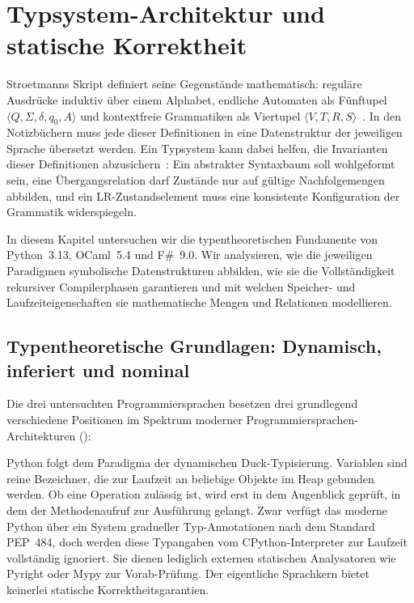 \chapter{Typsystem-Architektur und statische Korrektheit}
\label{chap:type_systems}

Stroetmanns Skript definiert seine Gegenstände mathematisch: reguläre Ausdrücke induktiv über einem Alphabet, endliche Automaten als Fünftupel $\langle Q, \Sigma, \delta, q_0, A \rangle$ und kontextfreie Grammatiken als Viertupel $\langle V, T, R, S \rangle$~\cite{stroetmann2026formal}.
In den Notizbüchern muss jede dieser Definitionen in eine Datenstruktur der jeweiligen Sprache übersetzt werden.
Ein Typsystem kann dabei helfen, die Invarianten dieser Definitionen abzusichern~\cite{pierce2002types}: Ein abstrakter Syntaxbaum soll wohlgeformt sein, eine Übergangsrelation darf Zustände nur auf gültige Nachfolgemengen abbilden, und ein LR-Zustandselement muss eine konsistente Konfiguration der Grammatik widerspiegeln.

In diesem Kapitel untersuchen wir die typentheoretischen Fundamente von Python~3.13, OCaml~5.4 und F\#~9.0. Wir analysieren, wie die jeweiligen Paradigmen symbolische Datenstrukturen abbilden, wie sie die Vollständigkeit rekursiver Compilerphasen garantieren und mit welchen Speicher- und Laufzeiteigenschaften sie mathematische Mengen und Relationen modellieren.

\section{Typentheoretische Grundlagen: Dynamisch, inferiert und nominal}
\label{sec:typing_foundations}

Die drei untersuchten Programmiersprachen besetzen drei grundlegend verschiedene Positionen im Spektrum moderner Programmiersprachen-Architekturen ():

Python folgt dem Paradigma der dynamischen Duck-Typisierung.
Variablen sind reine Bezeichner, die zur Laufzeit an beliebige Objekte im Heap gebunden werden.
Ob eine Operation zulässig ist, wird erst in dem Augenblick geprüft, in dem der Methodenaufruf zur Ausführung gelangt.
Zwar verfügt das moderne Python über ein System gradueller Typ-Annotationen nach dem Standard PEP~484, doch werden diese Typangaben vom CPython-Interpreter zur Laufzeit vollständig ignoriert.
Sie dienen lediglich externen statischen Analysatoren wie Pyright oder Mypy zur Vorab-Prüfung.
Der eigentliche Sprachkern bietet keinerlei statische Korrektheitsgarantien.

